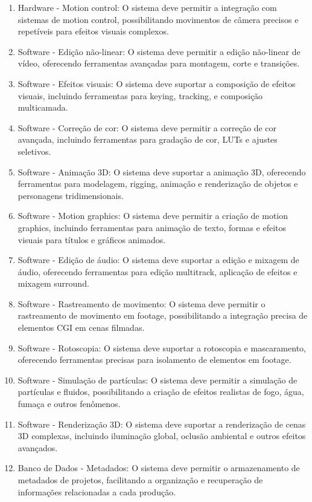 \begin{enumerate}
  \item Hardware - Motion control: O sistema deve permitir a integração com sistemas de motion control, possibilitando movimentos de câmera precisos e repetíveis para efeitos visuais complexos.
  \item Software - Edição não-linear: O sistema deve permitir a edição não-linear de vídeo, oferecendo ferramentas avançadas para montagem, corte e transições.
  \item Software - Efeitos visuais: O sistema deve suportar a composição de efeitos visuais, incluindo ferramentas para keying, tracking, e composição multicamada.
  \item Software - Correção de cor: O sistema deve permitir a correção de cor avançada, incluindo ferramentas para gradação de cor, LUTs e ajustes seletivos.
  \item Software - Animação 3D: O sistema deve suportar a animação 3D, oferecendo ferramentas para modelagem, rigging, animação e renderização de objetos e personagens tridimensionais.
  \item Software - Motion graphics: O sistema deve permitir a criação de motion graphics, incluindo ferramentas para animação de texto, formas e efeitos visuais para títulos e gráficos animados.
  \item Software - Edição de áudio: O sistema deve suportar a edição e mixagem de áudio, oferecendo ferramentas para edição multitrack, aplicação de efeitos e mixagem surround.
  \item Software - Rastreamento de movimento: O sistema deve permitir o rastreamento de movimento em footage, possibilitando a integração precisa de elementos CGI em cenas filmadas.
  \item Software - Rotoscopia: O sistema deve suportar a rotoscopia e mascaramento, oferecendo ferramentas precisas para isolamento de elementos em footage.
  \item Software - Simulação de partículas: O sistema deve permitir a simulação de partículas e fluidos, possibilitando a criação de efeitos realistas de fogo, água, fumaça e outros fenômenos.
  \item Software - Renderização 3D: O sistema deve suportar a renderização de cenas 3D complexas, incluindo iluminação global, oclusão ambiental e outros efeitos avançados.
  \item Banco de Dados - Metadados: O sistema deve permitir o armazenamento de metadados de projetos, facilitando a organização e recuperação de informações relacionadas a cada produção.

\end{enumerate}
